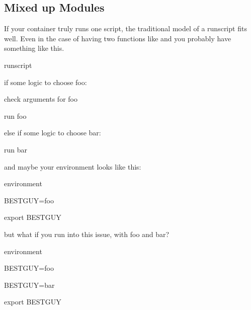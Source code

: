 \documentclass[letterpaper,10pt,english]{sphinxmanual}
\begin{document}
\subsection{Mixed up Modules}
\label{\detokenize{reproducible_scif_apps:mixed-up-modules}}
\begin{DUlineblock}{0em}
\item[] If your container truly runs one script, the traditional model of a
runscript fits well. Even in the case of having two functions like  and 
you probably have something like this.
\end{DUlineblock}

%
\begin{sphinxVerbatim}[commandchars=\\\{\}]
\PYGZpc{}runscript

if some logic to choose foo:

   check arguments for foo

   run foo

else if some logic to choose bar:

   run bar
\end{sphinxVerbatim}

and maybe your environment looks like this:

%
\begin{sphinxVerbatim}[commandchars=\\\{\}]
\PYGZpc{}environment

    BEST\PYGZus{}GUY=foo

    export BEST\PYGZus{}GUY
\end{sphinxVerbatim}

\begin{DUlineblock}{0em}
\item[] but what if you run into this issue, with foo and bar?
\end{DUlineblock}

%
\begin{sphinxVerbatim}[commandchars=\\\{\}]
\PYGZpc{}environment

    BEST\PYGZus{}GUY=foo

    BEST\PYGZus{}GUY=bar

    export BEST\PYGZus{}GUY
\end{sphinxVerbatim}
\end{document}
